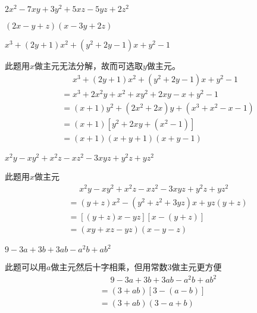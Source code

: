 \documentclass[windows,csize4]{BHCexam}
\begin{document}
\begin{groups}
    \begin{questions}[]
            \question[5] $2x^2-7xy+3y^2+5xz-5yz+2z^2$
            \begin{solution}{0.5cm}
                \methodonly $(2x-y+z)(x-3y+2z)$
            \end{solution}
            \vspace{3.5cm}

            \question[5] $x^3+(2y+1)x^2+(y^2+2y-1)x+y^2-1$
            \begin{solution}{0.5cm}
                \methodonly 此题用$x$做主元无法分解，故而可选取$y$做主元。
                \[
                    \begin{aligned}
                         & \phantom{=}x^3+(2y+1)x^2+(y^2+2y-1)x+y^2-1 \\
                         & =x^3+2x^2y+x^2+xy^2+2xy-x+y^2-1        \\
                         & =(x+1)y^2+(2x^2+2x)y+(x^3+x^2-x-1) \\
                         & =(x+1)\left[y^2+2xy+(x^2-1)\right] \\ 
                         & =(x+1)(x+y+1)(x+y-1)
                    \end{aligned}
                \]
            \end{solution}
        \vspace{3.5cm}

        \question[5] $x^2y-xy^2+x^2z-xz^2-3xyz+y^2z+yz^2$
        \begin{solution}{0.5cm}
            \methodonly 此题用$x$做主元
            \[
                \begin{aligned}
                     & \phantom{=}x^2y-xy^2+x^2z-xz^2-3xyz+y^2z+yz^2 \\
                     & =(y+z)x^2-(y^2+z^2+3yz)x+yz(y+z)  \\
                     & =\left[(y+z)x-yz\right]\left[x-(y+z)\right] \\ 
                     & = (xy+xz-yz)(x-y-z)
                \end{aligned}
            \]
        \end{solution}
        \vspace{3.5cm}

        \question[5] $9-3a+3b+3ab-a^2b+ab^2$
        \begin{solution}{0.5cm}
            \methodonly 此题可以用$a$做主元然后十字相乘，但用常数$3$做主元更方便
            \[
                \begin{aligned}
                     & \phantom{=}9-3a+3b+3ab-a^2b+ab^2 \\
                     & =(3+ab)\left[3-(a-b)\right]  \\ 
                     & =(3+ab)(3-a+b)
                \end{aligned}
            \]
        \end{solution}

    \end{questions}

\end{groups}






\label{lastpage}
\end{document}
